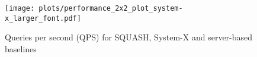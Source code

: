 \begin{figure}[h]%
\centering  %
\texttt{[image: plots/performance\_2x2\_plot\_system-x\_larger\_font.pdf]}
\caption{Queries per second (QPS) for SQUASH, System-X and server-based baselines}
\label{fig:squash-performance-graph}
\end{figure}